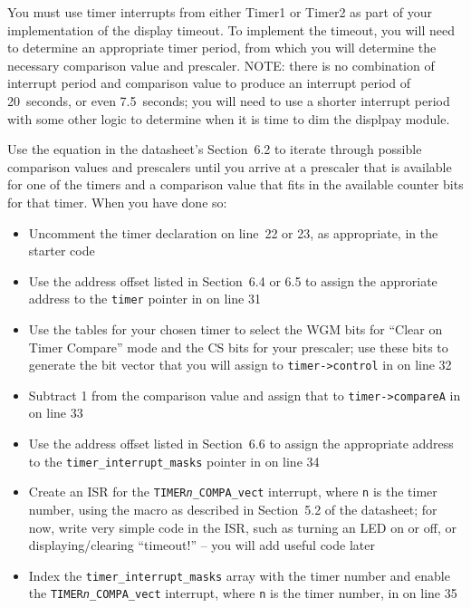 You must use timer interrupts from either Timer1 or Timer2 as part of your
implementation of the display timeout.
To implement the timeout, you will need to determine an appropriate timer period, from which you will determine the necessary comparison value and prescaler.
NOTE: there is no combination of interrupt period and comparison value to produce an interrupt period of 20~seconds, or even 7.5~seconds; you will need to use a shorter interrupt period with some other logic to determine when it is time to dim the displpay module.

Use the equation in the datasheet's Section~6.2 to iterate through possible comparison values and prescalers until you arrive at a prescaler that is available for one of the timers and a comparison value that fits in the available counter bits for that timer. When you have done so:
\begin{itemize}
    \item Uncomment the timer declaration on line~22 or 23, as appropriate, in the starter code
    \item Use the address offset listed in Section~6.4 or 6.5 to assign the approriate address to the \lstinline{timer} pointer in  on line 31
    \item Use the tables for your chosen timer to select the WGM bits for ``Clear on Timer Compare'' mode and the CS bits for your prescaler;
        use these bits to generate the bit vector that you will assign to \lstinline{timer->control} in  on line 32
    \item Subtract 1 from the comparison value and assign that to \lstinline{timer->compareA} in  on line 33
    \item Use the address offset listed in Section~6.6 to assign the appropriate address to the \lstinline{timer_interrupt_masks} pointer in  on line 34
    \item Create an ISR for the \texttt{TIMER\textit{n}\_COMPA\_vect} interrupt, where \texttt{n} is the timer number, using the  macro as described in Section~5.2 of the datasheet; for now, write very simple code in the ISR, such as turning an LED on or off, or displaying/clearing ``timeout!'' -- you will add useful code later
    \item Index the \lstinline{timer_interrupt_masks} array with the timer number and enable the \texttt{TIMER\textit{n}\_COMPA\_vect} interrupt, where \texttt{n} is the timer number, in  on line 35
\end{itemize}


